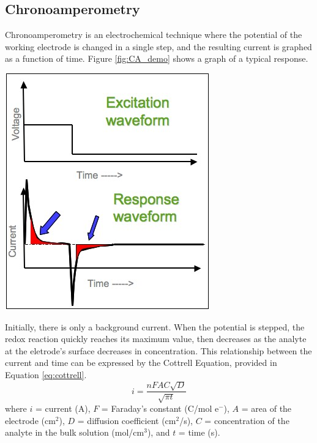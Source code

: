 \documentclass{article}
\begin{document}
\begin{multicols}{2}
{\subsection*{Chronoamperometry}
Chronoamperometry is an electrochemical technique where the potential of the
working electrode is changed in a single step, and the resulting current is
graphed as a function of time. 
Figure \ref{fig:CA_demo} shows a graph of a typical response.
\begin{center}
    \includegraphics[scale=0.22]{CA_demo}
    \label{fig:CA_demo}
\end{center}
Initially, there is only a background current. When the potential is
stepped, the redox reaction quickly reaches its maximum value, then
decreases as the analyte at the eletrode's surface decreases in
concentration. \cite{myers} This relationship between the current and time can be
expressed by the Cottrell Equation, provided in Equation \ref{eq:cottrell}.
\begin{equation}
    i = \frac{nFAC\sqrt{D}}{\sqrt{\pi t}}
\label{eq:cottrell}
\end{equation}
where $i$ = current (A), $F$ = Faraday's constant (C/mol e$^-$), $A$ = area of
the electrode (cm$^2$), $D$ = diffusion coefficient (cm$^2$/s), $C$ =
concentration of the analyte in the bulk solution (mol/cm$^3$), and $t$ =
time (s).

}
\end{multicols}
\end{document}
